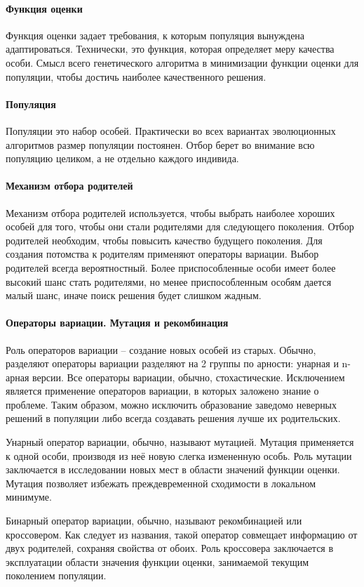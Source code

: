 \documentclass{fefu_thesis/cls/fefu}
\begin{document}
    \paragraph{Функция оценки}
    Функция оценки задает требования, к которым популяция вынуждена адаптироваться. Технически, это функция, которая определяет меру качества особи. Смысл всего генетического алгоритма в минимизации функции оценки для популяции, чтобы достичь наиболее качественного решения.
    \paragraph{Популяция}
    Популяции это набор особей. Практически во всех вариантах эволюционных алгоритмов размер популяции постоянен. Отбор берет во внимание всю популяцию целиком, а не отдельно каждого индивида.
    \paragraph{Механизм отбора родителей}
    Механизм отбора родителей используется, чтобы выбрать наиболее хороших особей для того, чтобы они стали родителями для следующего поколения. Отбор родителей необходим, чтобы повысить качество будущего поколения. Для создания потомства к родителям применяют операторы вариации. Выбор родителей всегда вероятностный. Более приспособленные особи имеет более высокий шанс стать родителями, но менее приспособленным особям дается малый шанс, иначе поиск решения будет слишком жадным.
    \paragraph{Операторы вариации. Мутация и рекомбинация}
    Роль операторов вариации -- создание новых особей из старых. Обычно, разделяют операторы вариации разделяют на 2 группы по арности: унарная и n-арная версии. Все операторы вариации, обычно, стохастические. Исключением является применение операторов вариации, в которых заложено знание о проблеме. Таким образом, можно исключить образование заведомо неверных решений в популяции либо всегда создавать решения лучше их родительских.

    Унарный оператор вариации, обычно, называют мутацией. Мутация применяется к одной особи, производя из неё новую слегка измененную особь. Роль мутации заключается в исследовании новых мест в области значений функции оценки. Мутация позволяет избежать преждевременной сходимости в локальном минимуме.

    Бинарный оператор вариации, обычно, называют рекомбинацией или кроссовером. Как следует из названия, такой оператор совмещает информацию от двух родителей, сохраняя свойства от обоих. Роль кроссовера заключается в эксплуатации области значения функции оценки, занимаемой текущим поколением популяции.
\end{document}
